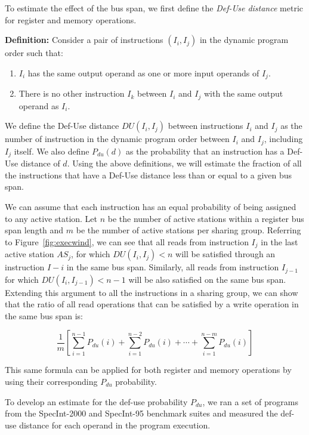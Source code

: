 \documentclass[10pt,twocolumn]{IEEEtran}
\begin{document}
To estimate the
effect of the bus span, we f{ir}st define the \emph{Def-Use distance}
metric for register and memory operations.

\textbf{Definition:}
Consider a pair of instructions $(I_i,I_j)$ in the dynamic
program order such that:
%
\begin{enumerate}
\item $I_i$ has the same output operand as one or more input operands of $I_j$.
\item There is no other instruction $I_k$ between $I_i$ and $I_j$ with the same
output operand as $I_i$.
\end{enumerate}
%
We define the Def-Use distance $DU(I_i,I_j)$ between instructions
$I_i$ and $I_j$
as the number of instruction in the dynamic program order
between $I_i$ and $I_j$, including $I_j$ itself.
We also define $P_{du}(d)$ as the probability that an instruction
has a Def-Use distance of $d$.
Using the above definitions, we will estimate the
fraction of all the instructions that have a Def-Use distance
less than or equal to a given bus span.

We can assume that each instruction has an
equal probability of being assigned to any active station.  
Let $n$ be
the number of active stations within a register bus span 
length and $m$ be the
number of active stations per sharing group.  
Referring to Figure~\ref{fig:execwind},
we can see that all reads from instruction $I_j$ in the last 
active station $AS_j$,
for which $DU(I_i,I_j) < n$ will be satisfied through an 
instruction $I-i$ in the
same bus span.  
Similarly, all reads from instruction $I_{j-1}$ for which
$DU(I_i,I_{j-1})<n-1$ will be also satisfied on the same bus span.  
Extending this argument to all the instructions in a sharing group, 
we can show that
the ratio of all read operations that can be satisfied by 
a write operation in the same bus span is:

\[
\frac{1}{m}\left[\sum_{i=1}^{n-1} P_{du}(i) + 
\sum_{i=1}^{n-2} P_{du}(i) + \cdots +
\sum_{i=1}^{n-m} P_{du}(i)\right]
\]

This same formula can be applied for both register and memory operations by
using their corresponding $P_{du}$ probability.

To develop an estimate for the def-use probability $P_{du}$, we 
ran a set of programs from the SpecInt-2000 and SpecInt-95 benchmark
suites and measured the def-use distance for each operand
in the program execution.

\end{document}
